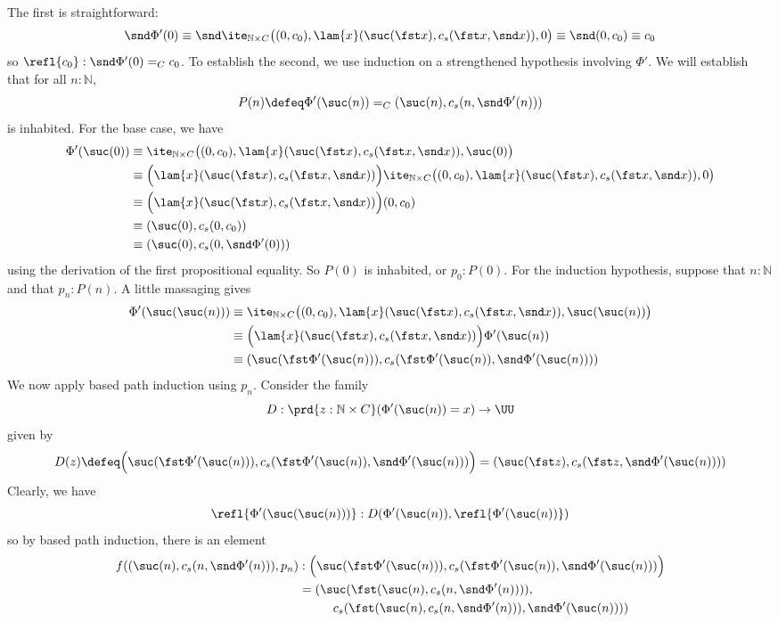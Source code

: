 The first is straightforward:
\[
\snd \Phi'(0)
\equiv
\snd\ite_{\mathbb{N} \times C}\big(
(0, c_{0}),
\lam{x}(\suc(\fst x), c_{s}(\fst x, \snd x)),
0
\big)
\equiv
\snd(0, c_{0})
\equiv
c_{0}
\]
so $\refl{c_{0}} : \snd\Phi'(0) =_{C} c_{0}$.  To establish the second, we use
induction on a strengthened hypothesis involving $\Phi'$.  We will establish
that for all $n : \mathbb{N}$,
\[
P(n) \defeq 
\Phi'(\suc(n)) =_{C} (\suc(n), c_{s}(n, \snd\Phi'(n)))
\]
is inhabited.
For the base case, we have
\begin{align*}
\Phi'(\suc(0)) &\equiv 
\ite_{\mathbb{N} \times C}\big(
(0, c_{0}),
\lam{x}(\suc(\fst x), c_{s}(\fst x, \snd x)),
\suc(0)
\big)
\\&\equiv
\Big(\lam{x}(\suc(\fst x), c_{s}(\fst x, \snd x))\Big)
\ite_{\mathbb{N} \times C}\big(
(0, c_{0}),
\lam{x}(\suc(\fst x), c_{s}(\fst x, \snd x)),
0
\big)
\\&\equiv
\Big(\lam{x}(\suc(\fst x), c_{s}(\fst x, \snd x))\Big)
(0, c_{0})
\\&\equiv
(\suc(0), c_{s}(0, c_{0}))
\\&\equiv
(\suc(0), c_{s}(0, \snd\Phi'(0)))
\end{align*}
using the derivation of the first propositional equality.  So $P(0)$ is
inhabited, or $p_{0} : P(0)$.  For the induction
hypothesis, suppose that $n : \mathbb{N}$ and that $p_{n} : P(n)$.  A little
massaging gives
\begin{align*}
\Phi'(\suc(\suc(n)))
&\equiv
\ite_{\mathbb{N} \times C}\big(
(0, c_{0}),
\lam{x}(\suc(\fst x), c_{s}(\fst x, \snd x)),
\suc(\suc(n))
\big)
\\&\equiv
\Big(\lam{x}(\suc(\fst x), c_{s}(\fst x, \snd x))\Big) \Phi'(\suc(n))
\\&\equiv
(\suc(\fst \Phi'(\suc(n))), c_{s}(\fst \Phi'(\suc(n)), \snd \Phi'(\suc(n)))) 
\end{align*}
We now apply based path induction using $p_{n}$.  Consider the family
\[
D : \prd{z:\mathbb{N} \times C}(\Phi'(\suc(n)) = x) \to \UU
\]
given by
\[
D(z) \defeq 
\Big(\suc(\fst \Phi'(\suc(n))), c_{s}(\fst \Phi'(\suc(n)), \snd
\Phi'(\suc(n)))\Big) 
=
(\suc(\fst z), c_{s}(\fst z, \snd \Phi'(\suc(n)))) 
\]
Clearly, we have
\[
\refl{\Phi'(\suc(\suc(n)))} : D(\Phi'(\suc(n)), \refl{\Phi'(\suc(n))})
\]
so by based path induction, there is an element
\begin{align*}
f((\suc(n), c_{s}(n, \snd\Phi'(n))), p_{n}) &:
\Big(\suc(\fst \Phi'(\suc(n))), c_{s}(\fst \Phi'(\suc(n)), \snd
\Phi'(\suc(n)))\Big) 
\\&=
(\suc(\fst (\suc(n), c_{s}(n, \snd\Phi'(n)))),
\\&\phantom{---}
c_{s}(\fst (\suc(n), c_{s}(n,
\snd\Phi'(n))), \snd\Phi'(\suc(n)))) 
\end{align*}
